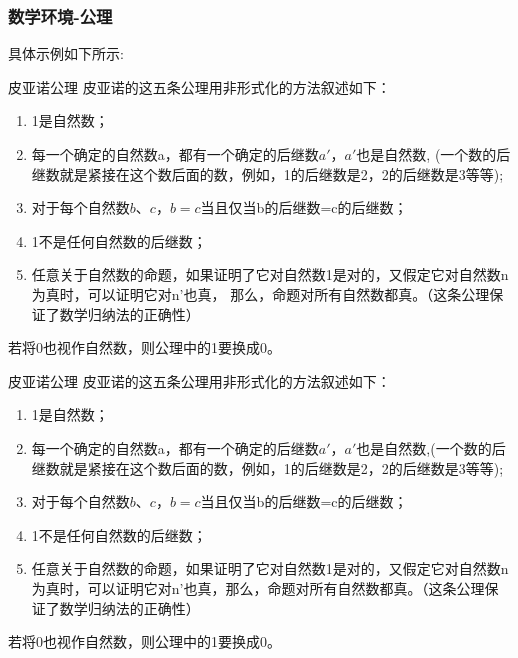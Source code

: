 \subsubsection{数学环境-公理}
具体示例如下所示:
\begin{tcblisting}{}
\begin{axiom}{皮亚诺公理}
皮亚诺的这五条公理用非形式化的方法叙述如下：
\begin{enumerate}
\item 1是自然数；
\item 每一个确定的自然数a，都有一个确定的后继数$a'$，$a'$也是自然数, 
(一个数的后继数就是紧接在这个数后面的数，例如，1的后继数是2，2的后继数是3等等);
\item 对于每个自然数$b、c，b=c$当且仅当b的后继数=c的后继数；
\item 1不是任何自然数的后继数；
\item 任意关于自然数的命题，如果证明了它对自然数1是对的，又假定它对自然数n为真时，可以证明它对n'也真， 
那么，命题对所有自然数都真。（这条公理保证了数学归纳法的正确性）
\end{enumerate}
若将0也视作自然数，则公理中的1要换成0。
\end{axiom}
\end{tcblisting}
   \begin{axiom}{皮亚诺公理}
    皮亚诺的这五条公理用非形式化的方法叙述如下：
    \begin{enumerate}
        \item 1是自然数；
        \item 每一个确定的自然数a，都有一个确定的后继数$a'$，$a'$也是自然数,(一个数的后继数就是紧接在这个数后面的数，例如，1的后继数是2，2的后继数是3等等);
        \item 对于每个自然数$b、c，b=c$当且仅当b的后继数=c的后继数；
        \item 1不是任何自然数的后继数；
        \item 任意关于自然数的命题，如果证明了它对自然数1是对的，又假定它对自然数n为真时，可以证明它对n'也真，那么，命题对所有自然数都真。（这条公理保证了数学归纳法的正确性）
    \end{enumerate}
    若将0也视作自然数，则公理中的1要换成0。
\end{axiom}
